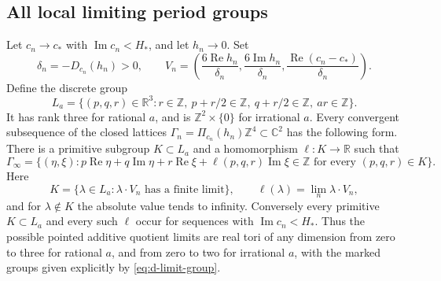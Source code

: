 \subsection{All local limiting period groups}\label{push:section:D.3}

\begin{theorem}\label{push:src:D.3.1}
Let \(c_n\to c_*\) with \(\operatorname{Im}c_n<H_*\), and let
\(h_n\to0\). Set
\[
 \delta_n=-D_{c_n}(h_n)>0,\qquad
 V_n=\left(\frac{6\operatorname{Re}h_n}{\delta_n},
           \frac{6\operatorname{Im}h_n}{\delta_n},
           \frac{\operatorname{Re}(c_n-c_*)}{\delta_n}\right).
\]
Define the discrete group
\[
 L_a=\{(p,q,r)\in\mathbb R^3:
    r\in\mathbb Z,\ p+r/2\in\mathbb Z,
    \ q+r/2\in\mathbb Z,\ ar\in\mathbb Z\}.
\]
It has rank three for rational \(a\), and is
\(\mathbb Z^2\times\{0\}\) for irrational \(a\).
Every convergent subsequence of the closed lattices
\(\Gamma_n=\Pi_{c_n}(h_n)\mathbb Z^4\subset\mathbb C^2\) has the
following form. There is a primitive subgroup \(K\subset L_a\) and
a homomorphism \(\ell:K\to\mathbb R\) such that
\begin{equation}\label{eq:d-limit-group}
 \Gamma_\infty=
 \{(\eta,\xi):p\operatorname{Re}\eta+q\operatorname{Im}\eta
       +r\operatorname{Re}\xi+\ell(p,q,r)\operatorname{Im}\xi
       \in\mathbb Z\text{ for every }(p,q,r)\in K\}.
\end{equation}
Here
\[
 K=\{\lambda\in L_a:\lambda\cdot V_n
                      \text{ has a finite limit}\},\qquad
 \ell(\lambda)=\lim_n\lambda\cdot V_n,
\]
and for \(\lambda\notin K\) the absolute value tends to infinity.
Conversely every primitive \(K\subset L_a\) and every such
\(\ell\) occur for sequences with \(\operatorname{Im}c_n<H_*\).
Thus the possible pointed additive quotient limits are real tori of
any dimension from zero to three for rational \(a\), and from zero
to two for irrational \(a\), with the marked groups given explicitly
by \eqref{eq:d-limit-group}.
\end{theorem}


